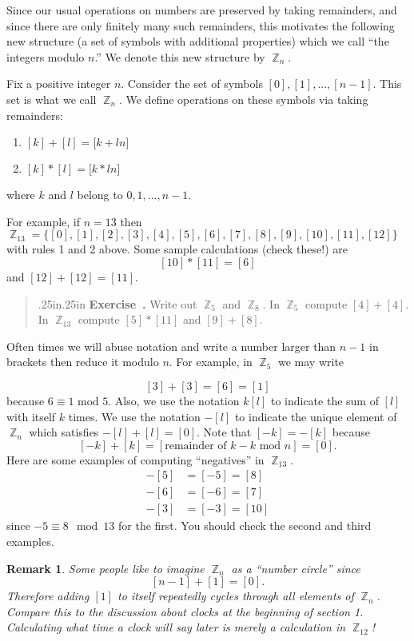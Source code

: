 \documentclass[12 pt]{article}
\newtheorem{remark}{Remark}
\DeclareMathOperator{\Z}{\mathbb{Z}}
\newcommand{\Mod}{\text{ mod }}
\newcounter{exercise}[section]
\newenvironment{exercise}{\refstepcounter{exercise}\par\bigskip \begin{quotation}{}{\leftmargin .25in\rightmargin .25in}
	\noindent \textbf{Exercise~\thesection.\theexercise }  \rmfamily}{\end{quotation}\par\bigskip}
\begin{document}
Since our usual operations on numbers are preserved by taking remainders, and since there are only finitely many such remainders, this motivates the following new structure (a set of symbols with additional properties) which we call ``the integers modulo $n$.'' We denote this new structure by $\Z_n$.

Fix a positive integer $n$. Consider the set of symbols $[0],[1],...,[n-1]$.  This set is what we call $\Z_n$. We define operations on these symbols via taking remainders:

\begin{center}
\begin{enumerate}
\item $[k]+[l]=[$$k+l$$n]$
\item $[k]*[l]=[$$k*l$$n]$
\end{enumerate}
\end{center}
where $k$ and $l$ belong to $0,1,...,n-1$.

For example, if $n=13$ then $\Z_{13}=\{[0],[1],[2],[3],[4],[5],[6],[7],[8],[9],$\linebreak$[10],[11],[12]\}$ with rules 1 and 2 above. Some sample calculations (check these!) are
\[
[10]*[11]=[6]
\]
and $[12]+[12]=[11]$.

\begin{exercise}
Write out $\Z_5$ and $\Z_8$. In $\Z_5$ compute $[4]+[4]$. In $\Z_{13}$ compute $[5]*[11]$ and $[9]+[8]$.
\end{exercise}

Often times we will abuse notation and write a number larger than $n-1$ in brackets then reduce it modulo $n$. For example, in $\Z_5$ we may write 

\[[3]+[3]=[6]=[1]\] 
because  $6\equiv 1\Mod 5$. Also, we use the notation $k[l]$ to indicate the sum of $[l]$ with itself $k$ times. We use the notation $-[l]$ to indicate the unique element of $\Z_n$ which satisfies $-[l]+[l]=[0]$. Note that $[-k]=-[k]$ because 
\[[-k]+[k]=[\text{remainder of }k-k\Mod n]=[0]. \]
Here are some examples of computing ``negatives'' in $\Z_{13}$.
\begin{align*}
-[5]&=[-5]=[8] \\
-[6]&=[-6]=[7] \\
-[3]&=[-3]=[10]
\end{align*}
since $-5\equiv 8\mod 13$ for the first. You should check the second and third examples.

\begin{remark}
Some people like to imagine $\Z_n$ as a ``number circle'' since \[[n-1]+[1]=[0].\] Therefore adding $[1]$ to itself repeatedly cycles through all elements of $\Z_n$. Compare this to the discussion about clocks at the beginning of section 1. Calculating what time a clock will say later is merely a calculation in $\Z_{12}$!
\end{remark}
\end{document}
